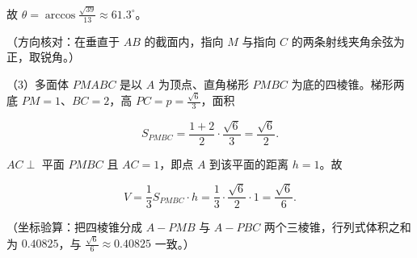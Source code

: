 \begin{answer}
故 $\theta=\arccos\frac{\sqrt{39}}{13}\approx61.3^\circ$。

（方向核对：在垂直于 $AB$ 的截面内，指向 $M$ 与指向 $C$ 的两条射线夹角余弦为正，取锐角。）

（3）多面体 $PMABC$ 是以 $A$ 为顶点、直角梯形 $PMBC$ 为底的四棱锥。梯形两底 $PM=1$、$BC=2$，高 $PC=p=\frac{\sqrt6}{3}$，面积

\nopagebreak[4]
\[S_{PMBC}=\frac{1+2}{2}\cdot\frac{\sqrt6}{3}=\frac{\sqrt6}{2}.\]

$AC\perp$ 平面 $PMBC$ 且 $AC=1$，即点 $A$ 到该平面的距离 $h=1$。故

\nopagebreak[4]
\[V=\frac13S_{PMBC}\cdot h=\frac13\cdot\frac{\sqrt6}{2}\cdot1=\frac{\sqrt6}{6}.\]

（坐标验算：把四棱锥分成 $A-PMB$ 与 $A-PBC$ 两个三棱锥，行列式体积之和为 $0.40825$，与 $\frac{\sqrt6}{6}\approx0.40825$ 一致。）


\end{answer}
